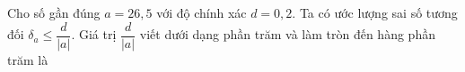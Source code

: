 \begin{ex}
Cho số gần đúng $a=26{,}5$ với độ chính xác $d=0{,}2$. Ta có ước lượng sai số tương đối $\delta_a\le\dfrac{d}{|a|}$. Giá trị $\dfrac{d}{|a|}$ viết dưới dạng phần trăm và làm tròn đến hàng phần trăm là
\end{ex}
